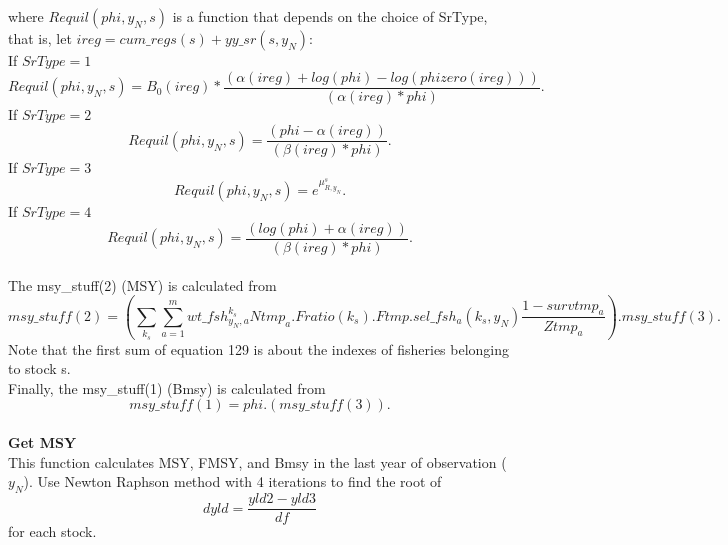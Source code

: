 \documentclass{article}
\begin{document}
where $Requil(phi,y_N,s)$ is a function that depends on the choice of SrType, that is, let $ireg=cum\_regs(s)+yy\_sr(s,y_N)$:\\
If $SrType=1$
\begin{equation}
    Requil(phi,y_N,s)=B_0(ireg) * \dfrac{(\alpha(ireg) + log(phi) - log(phizero(ireg)) )}  {(\alpha(ireg)*phi)}.
\end{equation}
If $SrType=2$
\begin{equation}
Requil(phi,y_N,s)=\dfrac{(phi-\alpha(ireg))}{(\beta(ireg)*phi)}.
\end{equation}
If $SrType=3$
\begin{equation}
    Requil(phi,y_N,s)=e^{\mu^s_{R,y_N}}.
\end{equation}
If $SrType=4$
\begin{equation}
    Requil(phi,y_N,s)=\dfrac{(log(phi)+\alpha(ireg))}{(\beta(ireg)*phi)}.
\end{equation}
\\
The msy\_stuff(2) (MSY) is calculated from
\begin{equation}
    msy\_stuff(2)=\left(\sum_{k_s}\sum_{a=1}^m wt\_fsh^{k_s}_{y_N,a}Ntmp_a.Fratio(k_s).Ftmp.sel\_fsh_a(k_s,y_N)\dfrac{1-survtmp_a}{Ztmp_a}\right).msy\_stuff(3).
\end{equation}
Note that the first sum of equation 129 is about the indexes of fisheries belonging to stock s.\\
Finally, the msy\_stuff(1) (Bmsy) is calculated from
\begin{equation}
    msy\_stuff(1)=phi.(msy\_stuff(3)).
\end{equation}
\\
\textbf{Get MSY}\\

This function calculates MSY, FMSY, and Bmsy in the last year of observation ($y_N$). 
Use Newton Raphson method with 4 iterations to find the root of
\begin{equation}
        dyld=\dfrac{yld2-yld3}{df}
    \end{equation}
    for each stock.\\
    
\end{document}
